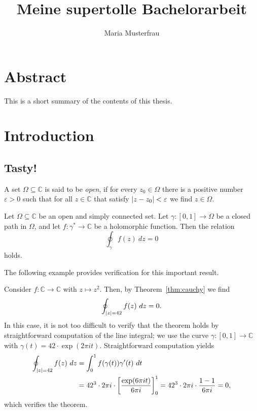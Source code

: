 \documentclass[11pt, twoside, bachelor]{bhthesis}
\title{Meine supertolle Bachelorarbeit}
\author{Maria Musterfrau}
\DeclarePairedDelimiter{\abs}{\lvert}{\rvert}
\begin{document}
\maketitle

\chapter*{Abstract}
This is a short summary of the contents of this thesis.

\tableofcontents

\chapter{Introduction}\label{chap:intro}

\section{Tasty!}

\begin{definition}
  A set $\Omega\subseteq\mathbb{C}$ is said to be \emph{open}, if for every
  $z_{0}\in\Omega$ there is a positive number $\varepsilon > 0$ such
  that for all $z\in\mathbb{C}$ that satisfy $\abs{z - z_{0}} <
  \varepsilon$ we find $z\in\Omega$.
\end{definition}

\begin{theorem}\label{thm:cauchy}
  Let $\Omega\subseteq\mathbb{C}$ be an open and simply connected
  set. Let $\gamma:[0,1]\to \Omega$ be a closed path in $\Omega$, and
  let $f\colon\gamma^{*} \to \mathbb{C}$ be a holomorphic function.
  Then the relation
  \begin{equation}\label{eq:cauchy-integral}
    \oint_{\gamma} f(z)~dz = 0
  \end{equation}
  holds.
\end{theorem}

The following example provides verification for this important result.

\begin{example}
  Consider $f\colon \mathbb{C} \to \mathbb{C}$ with $z\mapsto
  z^{2}$. Then, by Theorem~\ref{thm:cauchy} we find
  \[ \oint_{\abs{z} = 42} f(z)~dz = 0.  \]
  In this case, it is not too difficult to verify that the theorem
  holds by straightforward computation of the line integral; we use
  the curve $\gamma\colon [0,1]\to \mathbb{C}$ with $\gamma(t) =
  42\cdot\exp(2\pi i t)$. Straightforward computation yields
  \begin{align*}
    \oint_{\abs{z} = 42} f(z)~dz
    &= \int_{0}^{1} f(\gamma(t)) \gamma'(t)~dt\\
    &= 42^{3}\cdot 2\pi i \cdot \biggl[\frac{\exp(6 \pi i t)}{6 \pi
      i}\biggr]_{0}^{1} = 42^{3}\cdot 2\pi i\cdot \frac{1 - 1}{6\pi
      i} = 0,
  \end{align*}
  which verifies the theorem.
\end{example}
\end{document}

